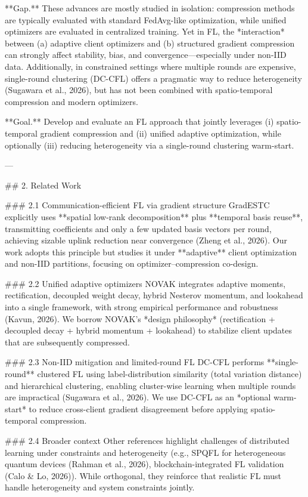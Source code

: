 **Gap.** These advances are mostly studied in isolation: compression methods are typically evaluated with standard FedAvg-like optimization, while unified optimizers are evaluated in centralized training. Yet in FL, the *interaction* between (a) adaptive client optimizers and (b) structured gradient compression can strongly affect stability, bias, and convergence—especially under non-IID data. Additionally, in constrained settings where multiple rounds are expensive, single-round clustering (DC-CFL) offers a pragmatic way to reduce heterogeneity (Sugawara et al., 2026), but has not been combined with spatio-temporal compression and modern optimizers.

**Goal.** Develop and evaluate an FL approach that jointly leverages (i) spatio-temporal gradient compression and (ii) unified adaptive optimization, while optionally (iii) reducing heterogeneity via a single-round clustering warm-start.

---

## 2. Related Work  

### 2.1 Communication-efficient FL via gradient structure  
GradESTC explicitly uses **spatial low-rank decomposition** plus **temporal basis reuse**, transmitting coefficients and only a few updated basis vectors per round, achieving sizable uplink reduction near convergence (Zheng et al., 2026). Our work adopts this principle but studies it under **adaptive** client optimization and non-IID partitions, focusing on optimizer–compression co-design.

### 2.2 Unified adaptive optimizers  
NOVAK integrates adaptive moments, rectification, decoupled weight decay, hybrid Nesterov momentum, and lookahead into a single framework, with strong empirical performance and robustness (Kavun, 2026). We borrow NOVAK’s *design philosophy* (rectification + decoupled decay + hybrid momentum + lookahead) to stabilize client updates that are subsequently compressed.

### 2.3 Non-IID mitigation and limited-round FL  
DC-CFL performs **single-round** clustered FL using label-distribution similarity (total variation distance) and hierarchical clustering, enabling cluster-wise learning when multiple rounds are impractical (Sugawara et al., 2026). We use DC-CFL as an *optional warm-start* to reduce cross-client gradient disagreement before applying spatio-temporal compression.

### 2.4 Broader context  
Other references highlight challenges of distributed learning under constraints and heterogeneity (e.g., SPQFL for heterogeneous quantum devices (Rahman et al., 2026), blockchain-integrated FL validation (Calo & Lo, 2026)). While orthogonal, they reinforce that realistic FL must handle heterogeneity and system constraints jointly.

